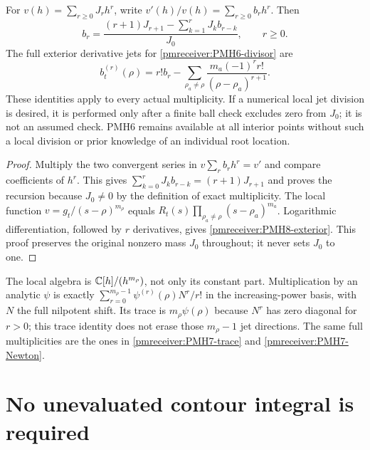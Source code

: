 \begin{pmreceivertheorem}
\label{pmreceiver:PMH8}
For $v(h)=\sum_{r\ge0}J_rh^r$, write
$v'(h)/v(h)=\sum_{r\ge0}b_rh^r$. Then
\begin{equation}\label{pmreceiver:PMH8-recursion}
 b_r=\frac{(r+1)J_{r+1}-\sum_{k=1}^rJ_kb_{r-k}}{J_0},
 \qquad r\ge0.
\end{equation}
The full exterior derivative jets for \eqref{pmreceiver:PMH6-divisor} are
\begin{equation}\label{pmreceiver:PMH8-exterior}
 b_t^{(r)}(\rho)=r!b_r
       -\sum_{\rho_a\ne\rho}
          \frac{m_a(-1)^r r!}{(\rho-\rho_a)^{r+1}}.
\end{equation}
These identities apply to every actual multiplicity. If a numerical
local jet division is desired, it is performed only after a finite
ball check excludes zero from $J_0$; it is not an assumed check.
PMH6 remains available at all interior points without such a
local division or prior knowledge of an individual root location.
\end{pmreceivertheorem}
\begin{proof}
Multiply the two convergent series in $v\sum_rb_rh^r=v'$ and
compare coefficients of $h^r$. This gives
$\sum_{k=0}^rJ_kb_{r-k}=(r+1)J_{r+1}$ and proves the recursion
because $J_0\ne0$ by the definition of exact multiplicity.
The local function $v=g_t/(s-\rho)^{m_\rho}$ equals
$R_t(s)\prod_{\rho_a\ne\rho}(s-\rho_a)^{m_a}$.
Logarithmic differentiation, followed by $r$ derivatives, gives
\eqref{pmreceiver:PMH8-exterior}. This proof preserves the original nonzero
mass $J_0$ throughout; it never sets $J_0$ to one.
\end{proof}

The local algebra is $\mathbb C[h]/(h^{m_\rho})$, not only its constant
part. Multiplication by an analytic $\psi$ is exactly
$\sum_{r=0}^{m_\rho-1}\psi^{(r)}(\rho)N^r/r!$ in the
increasing-power basis, with $N$ the full nilpotent shift. Its trace
is $m_\rho\psi(\rho)$ because $N^r$ has zero diagonal for $r>0$;
this trace identity does not erase those $m_\rho-1$ jet directions.
The same full multiplicities are the ones in
\eqref{pmreceiver:PMH7-trace} and \eqref{pmreceiver:PMH7-Newton}.

\section{No unevaluated contour integral is required}

